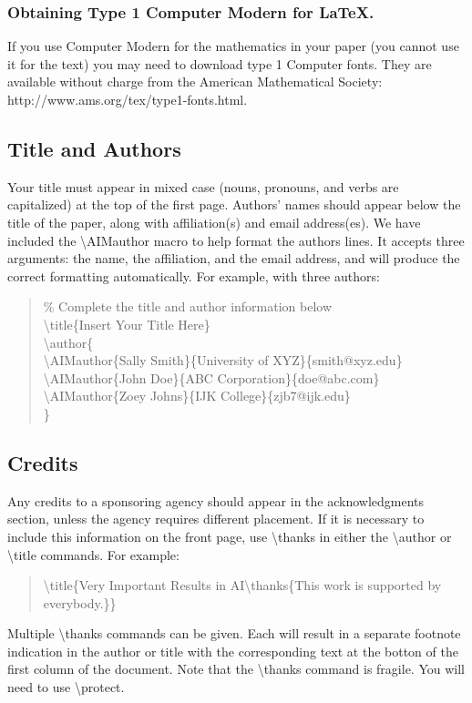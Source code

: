 \documentclass[letterpaper]{article}
\begin{document}
\subsubsection{Obtaining Type 1 Computer Modern for \LaTeX{}.}

If you use Computer Modern for the mathematics in your paper (you cannot use it for the text) you may need to download type 1 Computer fonts. They are available without charge from the American Mathematical Society:
http://www.ams.org/tex/type1-fonts.html. 

\subsection{Title and Authors}
Your title must appear in mixed case (nouns, pronouns, and verbs are capitalized) at the top of the first page.  Authors' names should appear below the title of the paper, along with affiliation(s) and email address(es).  We have included the \textbackslash AIMauthor macro to help format the authors lines.  It accepts three arguments: the name, the affiliation, and the email address, and will produce the correct formatting automatically.  For example, with three authors:

\begin{quote}
\begin{tiny}
\% Complete the title and author information below\\
\textbackslash title\{Insert Your Title Here\}\\
\textbackslash author\{\\
\textbackslash AIMauthor\{Sally Smith\}\{University of XYZ\}\{smith@xyz.edu\}\\
\textbackslash AIMauthor\{John Doe\}\{ABC Corporation\}\{doe@abc.com\}\\
\textbackslash AIMauthor\{Zoey Johns\}\{IJK College\}\{zjb7@ijk.edu\}\\
\}\\
\end{tiny}
\end{quote}



\subsection{Credits}
Any credits to a sponsoring agency should appear in the acknowledgments section, unless the agency requires different placement. If it is necessary to include this information on the front page, use
\textbackslash thanks in either the \textbackslash author or \textbackslash title commands.
For example:
\begin{quote}
\begin{small}
\textbackslash title\{Very Important Results in AI\textbackslash thanks\{This work is
 supported by everybody.\}\}
\end{small}
\end{quote}
Multiple \textbackslash thanks commands can be given. Each will result in a separate footnote indication in the author or title with the corresponding text at the botton of the first column of the document. Note that the \textbackslash thanks command is fragile. You will need to use \textbackslash protect.
\end{document}
